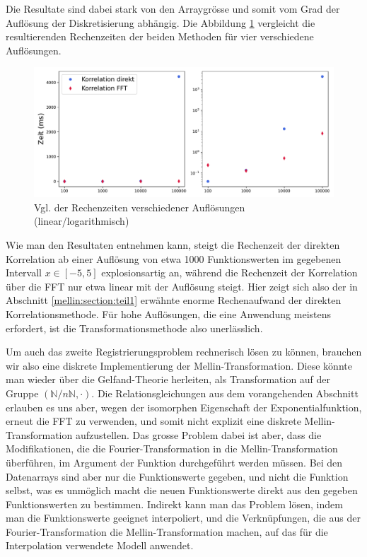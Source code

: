 Die Resultate sind dabei stark von den Arraygrösse und somit vom Grad der Auflösung 
der Diskretisierung abhängig.
Die Abbildung \ref{fig:mellin:zeiten} vergleicht die resultierenden Rechenzeiten 
der beiden Methoden für vier verschiedene Auflösungen.
\begin{figure}
    \centering
    \includegraphics[width=\textwidth]{papers/mellin/images/zeiten.pdf}
    \caption{Vgl. der Rechenzeiten verschiedener Auflösungen (linear/logarithmisch)}
    \label{fig:mellin:zeiten}
\end{figure}
Wie man den Resultaten entnehmen kann, steigt die Rechenzeit der direkten Korrelation
ab einer Auflösung von etwa 1000 Funktionswerten im gegebenen Intervall 
$x\in \left[-5,5\right]$ explosionsartig an, während die Rechenzeit der Korrelation 
über die FFT nur etwa linear mit der Auflösung steigt.
Hier zeigt sich also der in Abschnitt \ref{mellin:section:teil1} erwähnte enorme 
Rechenaufwand der direkten Korrelationsmethode.
Für hohe Auflösungen, die eine Anwendung meistens erfordert, ist die 
Transformationsmethode also unerlässlich.

Um auch das zweite Registrierungsproblem rechnerisch lösen zu können, brauchen wir also 
eine diskrete Implementierung der Mellin-Transformation.
Diese könnte man wieder über die Gelfand-Theorie herleiten, als Transformation auf der 
Gruppe $(\mathbb{N}/n\mathbb{N},\cdot)$.
Die Relationsgleichungen aus dem vorangehenden Abschnitt erlauben es uns aber, wegen der 
isomorphen Eigenschaft der Exponentialfunktion, erneut die FFT zu verwenden, und somit nicht explizit 
eine diskrete Mellin-Transformation aufzustellen.
Das grosse Problem dabei ist aber, dass die Modifikationen, die die Fourier-Trans\-for\-ma\-tion
in die Mellin-Transformation überführen, im Argument der Funktion durchgeführt werden 
müssen.
Bei den Datenarrays sind aber nur die Funktionswerte gegeben, und nicht die Funktion 
selbst, was es unmöglich macht die neuen Funktionswerte direkt aus den gegeben
Funktionswerten zu bestimmen.
Indirekt kann man das Problem lösen, indem man die Funktionswerte geeignet interpoliert, 
und die Verknüpfungen, die aus der Fourier-Transformation die Mellin-Transformation 
machen, auf das für die Interpolation verwendete Modell anwendet.

